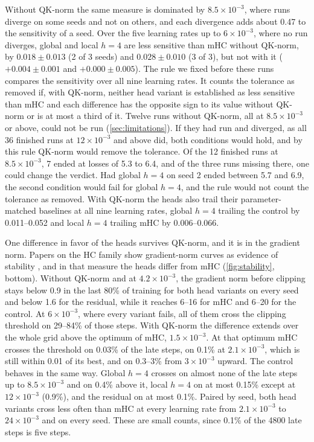 \documentclass[11pt, a4paper]{article}
\newcommand{\lr}[1]{\ensuremath{#1 \times 10^{-3}}}
\begin{document}
Without QK-norm the same measure is dominated by \lr{8.5}, where runs diverge on some seeds and not on others, and each divergence
adds about 0.47 to the sensitivity of a seed. Over the five learning rates up to \lr{6}, where no run diverges, global and local
$h = 4$ are less sensitive than mHC without QK-norm, by $0.018 \pm 0.013$ (2 of 3 seeds) and $0.028 \pm 0.010$ (3 of 3), but not
with it ($+0.004 \pm 0.001$ and $+0.000 \pm 0.005$). The rule we fixed before these runs compares the sensitivity over all nine
learning rates. It counts the tolerance as removed if, with QK-norm, neither head variant is established as less sensitive than
mHC and each difference has the opposite sign to its value without QK-norm or is at most a third of it. Twelve runs without
QK-norm, all at \lr{8.5} or above, could not be run (\cref{sec:limitations}). If they had run and diverged, as all 36 finished runs at \lr{12} and above did, both conditions
would hold, and by this rule QK-norm would remove the tolerance. Of the 12 finished runs at \lr{8.5}, 7 ended at losses of 5.3 to 6.4, and
of the three runs missing there, one could change the verdict. Had global $h = 4$ on seed 2 ended between 5.7 and 6.9, the
second condition would fail for global $h = 4$, and the rule would not count the tolerance as removed. With QK-norm the heads also trail their parameter-matched
baselines at all nine learning rates, global $h = 4$ trailing the control by 0.011--0.052 and local $h = 4$ trailing mHC by
0.006--0.066.

One difference in favor of the heads survives QK-norm, and it is in the gradient norm. Papers on the HC family show
gradient-norm curves as evidence of stability \citep{xie2026mhc, yang2026mhclite, zhou2026kromhc, liu2026shc, lyubinin2026tbpmhc},
and in that measure the heads differ from mHC (\cref{fig:stability}, bottom). Without QK-norm and at \lr{4.2}, the gradient norm before
clipping stays below 0.9 in the last 80\% of training for both head variants on every seed and below 1.6 for the residual, while
it reaches 6--16 for mHC and 6--20 for the control. At \lr{6}, where every variant fails, all of them cross the clipping threshold
on 29--84\% of those steps. With QK-norm the difference extends over the whole grid above the optimum of mHC, \lr{1.5}. At that
optimum mHC crosses the threshold on 0.03\% of the late steps, on 0.1\% at \lr{2.1}, which is still within 0.01 of its best, and
on 0.3--3\% from \lr{3} upward. The control behaves in the same way. Global $h = 4$ crosses on almost none of the late
steps up to \lr{8.5} and on 0.4\% above it, local $h = 4$ on at most 0.15\% except at \lr{12} (0.9\%), and the residual on at most
0.1\%. Paired by seed, both head variants cross less often than mHC at every learning rate from \lr{2.1} to \lr{24} and on every
seed. These are small counts, since 0.1\% of the 4800 late steps is five steps.
\end{document}
